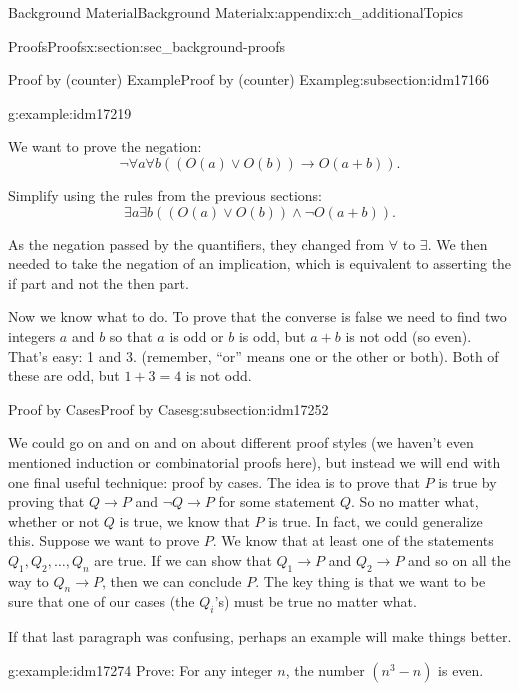 \documentclass[oneside,10pt,]{book}
\numberwithin{equation}{chapter}
\def\imp{\rightarrow}
\begin{document}
\begin{appendixptx}{Background Material}{}{Background Material}{}{}{x:appendix:ch_additionalTopics}
\begin{sectionptx}{Proofs}{}{Proofs}{}{}{x:section:sec_background-proofs}
\begin{subsectionptx}{Proof by (counter) Example}{}{Proof by (counter) Example}{}{}{g:subsection:idm17166}
\begin{example}{}{g:example:idm17219}
%
\par
We want to prove the negation:%
\begin{equation*}
\neg \forall a \forall b ((O(a) \vee O(b)) \imp O(a+b)).
\end{equation*}
%
\par
Simplify using the rules from the previous sections:%
\begin{equation*}
\exists a \exists b ((O(a) \vee O(b)) \wedge \neg O(a+b)).
\end{equation*}
%
\par
As the negation passed by the quantifiers, they changed from \(\forall\) to \(\exists\). We then needed to take the negation of an implication, which is equivalent to asserting the if part and not the then part.%
\par
Now we know what to do. To prove that the converse is false we need to find two integers \(a\) and \(b\) so that \(a\) is odd or \(b\) is odd, but \(a+b\) is not odd (so even). That's easy: 1 and 3. (remember, ``or'' means one or the other or both). Both of these are odd, but \(1+3 = 4\) is not odd.%
\end{example}
\end{subsectionptx}
%
%
\typeout{************************************************}
\typeout{************************************************}
%
\begin{subsectionptx}{Proof by Cases}{}{Proof by Cases}{}{}{g:subsection:idm17252}
%
\par
We could go on and on and on about different proof styles (we haven't even mentioned induction or combinatorial proofs here), but instead we will end with one final useful technique: proof by cases. The idea is to prove that \(P\) is true by proving that \(Q \imp P\) and \(\neg Q \imp P\) for some statement \(Q\). So no matter what, whether or not \(Q\) is true, we know that \(P\) is true. In fact, we could generalize this. Suppose we want to prove \(P\). We know that at least one of the statements \(Q_1, Q_2, \ldots, Q_n\) are true. If we can show that \(Q_1 \imp P\) and \(Q_2 \imp P\) and so on all the way to \(Q_n \imp P\), then we can conclude \(P\). The key thing is that we want to be sure that one of our cases (the \(Q_i\)'s) must be true no matter what.%
\par
If that last paragraph was confusing, perhaps an example will make things better.%
\begin{example}{}{g:example:idm17274}%
Prove: For any integer \(n\), the number \((n^3 -n)\) is even.%

\end{example}
\end{subsectionptx}
\end{sectionptx}
\end{appendixptx}
\end{document}
